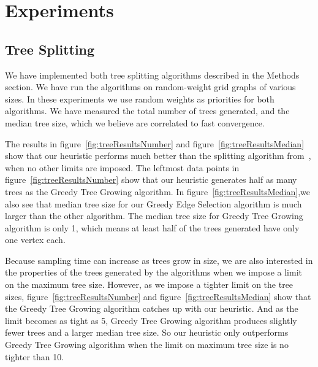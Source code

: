 \documentclass{article} %
\begin{document}
\section{Experiments}

\subsection{Tree Splitting}%

We have implemented both tree splitting algorithms described in the
Methods section.  We have run the algorithms on random-weight grid
graphs of various sizes. In these experiments we use random weights as
priorities for both algorithms. We have measured the total number of
trees generated, and the median tree size, which we believe are
correlated to fast convergence.

The results in figure~\ref{fig:treeResultsNumber} and
figure~\ref{fig:treeResultsMedian} show that our heuristic performs
much better than the splitting algorithm
from~\cite{rivasseau2005jungle}, when no other limits are imposed.
The leftmost data points in figure~\ref{fig:treeResultsNumber} show
that our heuristic generates half as many trees as the Greedy Tree
Growing algorithm. In figure~\ref{fig:treeResultsMedian},we also see
that median tree size for our Greedy Edge Selection algorithm is much
larger than the other algorithm. The median tree size for Greedy Tree
Growing algorithm is only 1, which means at least half of the trees
generated have only one vertex each.

Because sampling time can increase as trees grow in size, we are also
interested in the properties of the trees generated by the algorithms
when we impose a limit on the maximum tree size. However, as we impose
a tighter limit on the tree sizes, figure~\ref{fig:treeResultsNumber}
and figure~\ref{fig:treeResultsMedian} show that the Greedy Tree
Growing algorithm catches up with our heuristic. And as the limit
becomes as tight as 5, Greedy Tree Growing algorithm produces slightly
fewer trees and a larger median tree size. So our heuristic only
outperforms Greedy Tree Growing algorithm when the limit on maximum
tree size is no tighter than 10.
\end{document}
